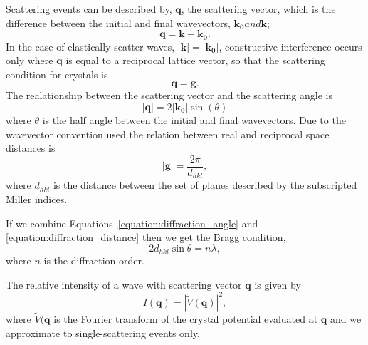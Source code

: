 Scattering events can be described by, $\mathbf{q}$, the scattering vector, which is the difference between the initial and final wavevectors, $\mathbf{k_0} and \mathbf{k}$;
\begin{equation}
\mathbf{q} = \mathbf{k} - \mathbf{k_0}.
\end{equation}
In the case of elastically scatter waves, $|\mathbf{k}| = |\mathbf{k_0}|$, constructive interference occurs only where $\mathbf{q}$ is equal to a reciprocal lattice vector, so that the scattering condition for crystals is
\begin{equation}
\mathbf{q} = \mathbf{g}.
\end{equation}
The realationship between the scattering vector and the scattering angle is
\begin{equation}\label{equation:diffraction_angle}
\left|\mathbf{q}\right| = 2\left|\mathbf{k_0}\right|\sin(\theta)
\end{equation}
where $\theta$ is the half angle between the initial and final wavevectors.
Due to the wavevector convention used the relation between real and reciprocal space distances is
\begin{equation}\label{equation:diffraction_distance}
\left|\mathbf{g}\right| = \frac{2\pi}{d_{hkl}},
\end{equation}
where $d_{hkl}$ is the distance between the set of planes described by the subscripted Miller indices.

If we combine Equations~\ref{equation:diffraction_angle} and \ref{equation:diffraction_distance} then we get the Bragg condition,
\begin{equation}
2d_{hkl}\sin\theta = n\lambda,
\end{equation}
where $n$ is the diffraction order.

The relative intensity of a wave with scattering vector $\mathbf{q}$ is given by
\begin{equation}
I(\mathbf{q}) = \left|\tilde{V}(\mathbf{q})\right|^2,
\end{equation}
where $\tilde{V}(\mathbf{q}$ is the Fourier transform of the crystal potential evaluated at $\mathbf{q}$ and we approximate to single-scattering events only.

